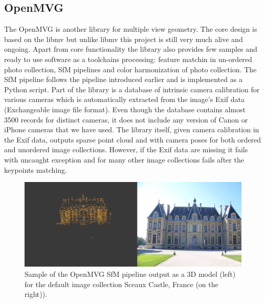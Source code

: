 \subsection*{OpenMVG}
The OpenMVG \cite{openMVG} is another library for multiple view geometry. The core design is based on the libmv but unlike libmv this project is still very much alive and ongoing. Apart from core functionality the library also provides few samples and ready to use software as a toolchains processing: feature matchin in un-ordered photo collection, SfM pipelines and color harmonization of photo collection. The SfM pipeline follows the pipeline introduced earlier and is implemented as a Python script. Part of the library is a database of intrinsic camera calibration for various cameras which is automatically extracted from the image's Exif data (Exchangeable image file format). Even though the database contains almost 3500 records for distinct cameras, it does not include any version of Canon  or iPhone cameras that we have used. The library itself, given camera calibration in the Exif data, outputs sparse point cloud and with camera poses for both ordered and unordered image collections. However, if the Exif data are missing it fails with uncaught exception and for many other image collections fails after the keypoints matching.

\begin{figure}[ht]
	\begin{center}
		\includegraphics[keepaspectratio,width=\textwidth]{fig/openmvg.pdf}
	\end{center}
	\caption{Sample of the OpenMVG SfM pipeline output as a 3D model (left) for the default image collection Sceaux Castle, France (on the right)).}
	\label{fig:openvmg}
\end{figure}


